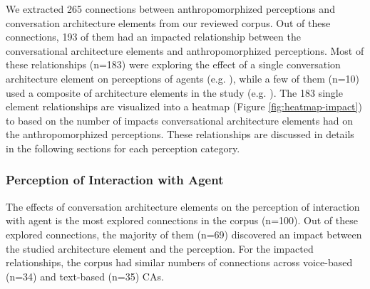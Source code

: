 \documentclass[sigconf,screen,review, anonymous]{acmart}
\newcommand{\cmt}[1]{}%
\begin{document}
We extracted 265 connections between anthropomorphized perceptions and conversation architecture elements from our reviewed corpus. Out of these connections, 193 of them had an impacted relationship between the conversational architecture elements and anthropomorphized perceptions. Most of these relationships (n=183) were exploring the effect of a single conversation architecture element on perceptions of agents (e.g. \cite{miehle2018exploring}\cmt{[51]}\cite{westerman2019believe}\cmt{[9]}), while a few of them (n=10) used a composite of architecture elements in the study (e.g. \cite{seeger2021chatbots}\cmt{[35]}\cite{volkel2021manipulating}\cmt{[68]}). The 183 single element relationships are visualized into a heatmap (Figure \ref{fig:heatmap-impact}) to based on the number of impacts conversational architecture elements had on the anthropomorphized perceptions. These relationships are discussed in details in the following sections for each perception category.


 

\subsubsection{Perception of Interaction with Agent}

The effects of conversation architecture elements on the perception of interaction with agent is the most explored connections in the corpus (n=100). Out of these explored connections, the majority of them (n=69) discovered an impact between the studied architecture element and the perception. For the impacted relationships, the corpus had similar numbers of connections across voice-based (n=34) and text-based (n=35) CAs.
\end{document}
